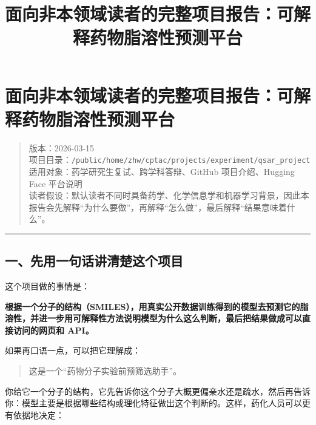\documentclass[
  ,
]{ctexart}
\title{面向非本领域读者的完整项目报告：可解释药物脂溶性预测平台}
\author{}
\date{}
\begin{document}
\maketitle

\hypertarget{ux9762ux5411ux975eux672cux9886ux57dfux8bfbux8005ux7684ux5b8cux6574ux9879ux76eeux62a5ux544aux53efux89e3ux91caux836fux7269ux8102ux6eb6ux6027ux9884ux6d4bux5e73ux53f0}{%
\section{面向非本领域读者的完整项目报告：可解释药物脂溶性预测平台}\label{ux9762ux5411ux975eux672cux9886ux57dfux8bfbux8005ux7684ux5b8cux6574ux9879ux76eeux62a5ux544aux53efux89e3ux91caux836fux7269ux8102ux6eb6ux6027ux9884ux6d4bux5e73ux53f0}}

\begin{quote}
版本：2026-03-15\\
项目目录：\texttt{/public/home/zhw/cptac/projects/experiment/qsar\_project}\\
适用对象：药学研究生复试、跨学科答辩、GitHub 项目介绍、Hugging Face
平台说明\\
读者假设：默认读者不同时具备药学、化学信息学和机器学习背景，因此本报告会先解释``为什么要做''，再解释``怎么做''，最后解释``结果意味着什么''。
\end{quote}

\begin{center}\rule{0.5\linewidth}{0.5pt}\end{center}

\hypertarget{ux4e00ux5148ux7528ux4e00ux53e5ux8bddux8bb2ux6e05ux695aux8fd9ux4e2aux9879ux76ee}{%
\subsection{一、先用一句话讲清楚这个项目}\label{ux4e00ux5148ux7528ux4e00ux53e5ux8bddux8bb2ux6e05ux695aux8fd9ux4e2aux9879ux76ee}}

这个项目做的事情是：

\textbf{根据一个分子的结构（SMILES），用真实公开数据训练得到的模型去预测它的脂溶性，并进一步用可解释性方法说明模型为什么这么判断，最后把结果做成可以直接访问的网页和
API。}

如果再口语一点，可以把它理解成：

\begin{quote}
这是一个``药物分子实验前预筛选助手''。
\end{quote}

你给它一个分子的结构，它先告诉你这个分子大概更偏亲水还是疏水，然后再告诉你：模型主要是根据哪些结构或理化特征做出这个判断的。这样，药化人员可以更有依据地决定：
\end{document}
